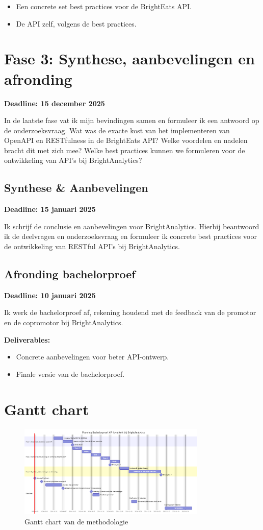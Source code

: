 \begin{itemize}
  \item Een concrete set best practices voor de Bright\-Eats API.
  \item De API zelf, volgens de best practices.
\end{itemize}

\section{Fase 3: Synthese, aanbevelingen en afronding}

\textbf{Deadline: 15 december 2025}

\bigskip
In de laatste fase vat ik mijn bevindingen samen en formuleer ik een antwoord op de onderzoeksvraag. Wat was de exacte kost van het implementeren van OpenAPI en RESTfulness in de Bright\-Eats API? Welke voordelen en nadelen bracht dit met zich mee? Welke best practices kunnen we formuleren voor de ontwikkeling van API's bij BrightAnalytics?

\subsection{Synthese \& Aanbevelingen}

\textbf{Deadline: 15 januari 2025}

\bigskip
Ik schrijf de conclusie en aanbevelingen voor BrightAnalytics. Hierbij beantwoord ik de deelvragen en onderzoeksvraag en formuleer ik concrete best practices voor de ontwikkeling van RESTful API's bij BrightAnalytics.

\subsection{Afronding bachelorproef}

\textbf{Deadline: 10 januari 2025}

\bigskip
Ik werk de bachelorproef af, rekening houdend met de feedback van de promotor en de copromotor bij BrightAnalytics.

\textbf{Deliverables:}

\begin{itemize}
  \item Concrete aanbevelingen voor beter API-ontwerp.
  \item Finale versie van de bachelorproef.
\end{itemize}

\section{Gantt chart}

\begin{figure}[H]
  \centering
  \includegraphics[width=0.8\textwidth]{gantt.png}
  \caption{Gantt chart van de methodologie}
  \label{fig:gantt}
\end{figure}
